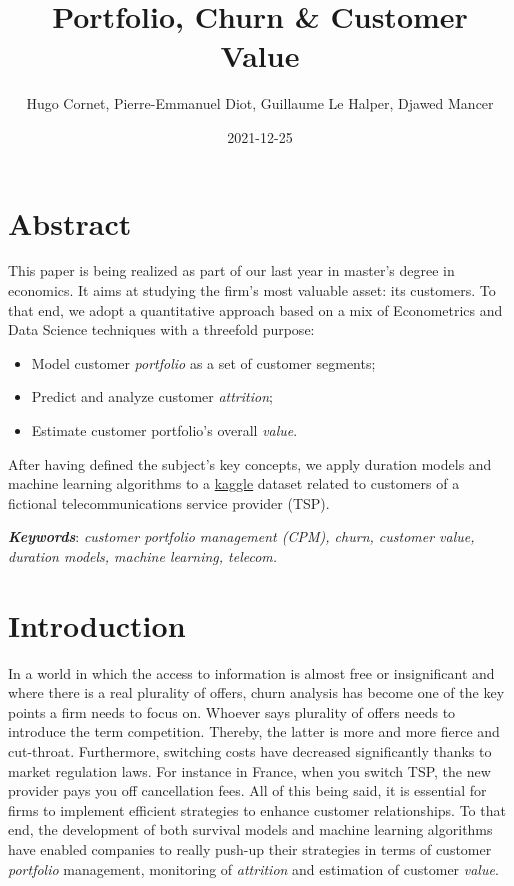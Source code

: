 \documentclass[
]{book}
\title{Portfolio, Churn \& Customer Value}
\author{Hugo Cornet, Pierre-Emmanuel Diot, Guillaume Le Halper, Djawed Mancer}
\date{2021-12-25}
\providecommand{\tightlist}{%
  \setlength{\itemsep}{0pt}\setlength{\parskip}{0pt}}
\begin{document}
\maketitle

{
\setcounter{tocdepth}{1}
\tableofcontents
}
\hypertarget{abstract}{%
\chapter*{Abstract}\label{abstract}}

This paper is being realized as part of our last year in master's degree in economics. It aims at studying the firm's most valuable asset: its customers. To that end, we adopt a quantitative approach based on a mix of Econometrics and Data Science techniques with a threefold purpose:

\begin{itemize}
\tightlist
\item
  Model customer \emph{portfolio} as a set of customer segments;
\item
  Predict and analyze customer \emph{attrition};
\item
  Estimate customer portfolio's overall \emph{value}.
\end{itemize}

After having defined the subject's key concepts, we apply duration models and machine learning algorithms to a \href{https://www.kaggle.com/yeanzc/telco-customer-churn-ibm-dataset}{kaggle} dataset related to customers of a fictional telecommunications service provider (TSP).

\textbf{\emph{Keywords}}: \emph{customer portfolio management (CPM), churn, customer value, duration models, machine learning, telecom.}

\hypertarget{intro}{%
\chapter{Introduction}\label{intro}}

In a world in which the access to information is almost free or insignificant and where there is a real plurality of offers, churn analysis has become one of the key points a firm needs to focus on. Whoever says plurality of offers needs to introduce the term competition. Thereby, the latter is more and more fierce and cut-throat. Furthermore, switching costs have decreased significantly thanks to market regulation laws. For instance in France, when you switch TSP, the new provider pays you off cancellation fees. All of this being said, it is essential for firms to implement efficient strategies to enhance customer relationships. To that end, the development of both survival models and machine learning algorithms have enabled companies to really push-up their strategies in terms of customer \emph{portfolio} management, monitoring of \emph{attrition} and estimation of customer \emph{value}.
\end{document}
